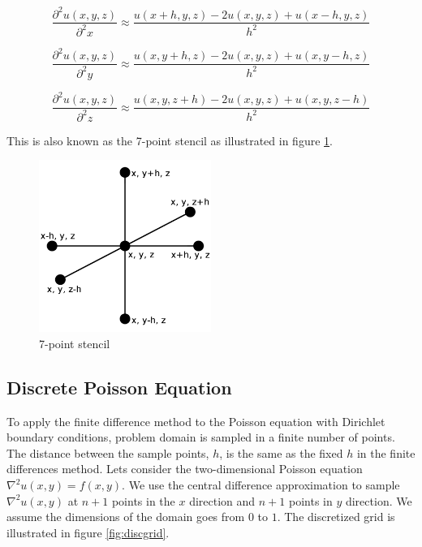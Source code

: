 $$\frac{\partial^2 u(x, y, z)}{\partial^2 x} \approx \frac{u(x+h, y, z) - 2u(x, y, z) + u(x-h, y, z)}{h^2}$$

$$\frac{\partial^2 u(x, y, z)}{\partial^2 y} \approx \frac{u(x, y+h, z) - 2u(x, y, z) + u(x, y-h, z)}{h^2}$$

$$\frac{\partial^2 u(x, y, z)}{\partial^2 z} \approx \frac{u(x, y, z+h) - 2u(x, y, z) + u(x, y, z-h)}{h^2}$$

This is also known as the 7-point stencil as illustrated in figure \ref{fig:7ps}.

\begin{figure}[ht]
	\center
	\includegraphics[width=0.5\textwidth]{images/7_point_stencil}
	\caption{7-point stencil}
	\label{fig:7ps}
\end{figure}

\subsection{Discrete Poisson Equation}

To apply the finite difference method to the Poisson equation with Dirichlet 
boundary conditions, problem domain is sampled in a finite number of points. 
The distance between the sample points, $h$, is the same as the fixed $h$ in the finite
differences method. Lets consider the two-dimensional Poisson equation $\nabla^2
u(x, y) = f(x, y)$. We use the central difference approximation to sample
$\nabla^2 u(x, y)$ at $n+1$ points in the $x$ direction and $n+1$ points in $y$
direction. We assume the dimensions of the domain goes from $0$ to $1$. The discretized 
grid is illustrated in figure \ref{fig:discgrid}.

